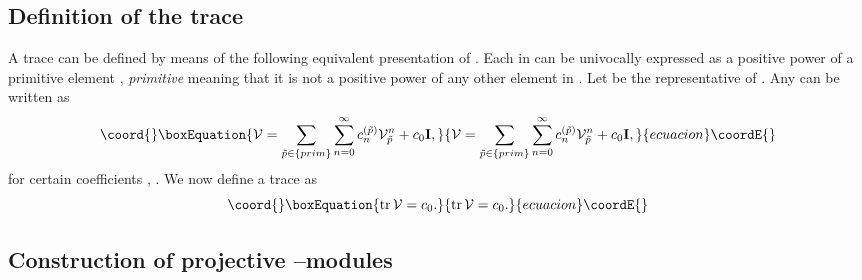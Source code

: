 \documentclass[a4paper,a4paper]{article}
\begin{document}
\subsection{Definition of the trace}\label{deftrace} 
 
A trace can be defined by means of the following equivalent presentation of    
\coordHE{} \cite{PROCEEDINGS}. Each \coordHE{}   
in \myHighlight{$\Gamma$}\coordHE{} can be univocally expressed as a positive power of a primitive element   
\coordHE{}, {\it primitive} meaning that it is not a positive power of  
any other element in \myHighlight{$\Gamma$}\coordHE{} \cite{MCKEAN}. Let \coordHE{} 
be the representative of \coordHE{}. Any \coordHE{} can  be written as  
\begin{equation}\coord{}\boxEquation{  
{\cal V}=\sum_{\tilde p\in\{prim\}}\sum_{n=0}^{\infty}c_n^{(\tilde p)}{\cal 
V}_{\tilde p}^n + c_0{{\bf  I}},  
\label{prim}  
}{  
{\cal V}=\sum_{\tilde p\in\{prim\}}\sum_{n=0}^{\infty}c_n^{(\tilde p)}{\cal 
V}_{\tilde p}^n + c_0{{\bf  I}},  
}{ecuacion}\coordE{}\end{equation}  
for certain coefficients \coordHE{}, \coordHE{}. We now define a trace as  
\begin{equation}\coord{}\boxEquation{ 
{\rm tr}\,{\cal V}=c_0.  
\label{traccia}
}{ 
{\rm tr}\,{\cal V}=c_0.  
}{ecuacion}\coordE{}\end{equation} 
  
\subsection{Construction of projective \coordHE{}--modules 
\coordHE{}}\label{construction}  
  
\end{document}

